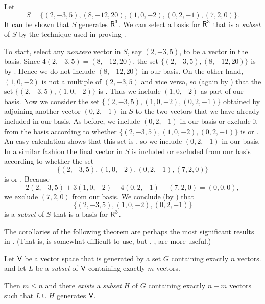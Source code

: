 \begin{example} \label{example 1.6.6}
Let
\[
    S = \{ (2, -3, 5), (8, -12, 20), (1, 0, -2), (0, 2, -1), (7, 2, 0) \}.
\]
It can be shown that \(S\) generates \(\textsf{R}^3\).
We can select a basis for \(\textsf{R}^3\) that is a \emph{subset} of \(S\) by the technique used in proving .

To start, select any \emph{nonzero} vector in \(S\), say \((2, -3, 5)\), to be a vector in the basis.
Since \(4(2, -3, 5) = (8 , -12, 20)\), the set \(\{ (2, -3, 5), (8 , -12, 20) \}\) is \LDP{} by .
Hence we do not include \((8, -12, 20)\) in our basis.
On the other hand, \((1, 0, -2)\) is not a multiple of \((2, -3, 5)\) and vice versa, so (again by ) that the set \(\{ (2, -3, 5), (1, 0, -2) \}\) is \LID{}.
Thus we include \((1, 0, -2)\) as part of our basis.
Now we consider the set \(\{ (2, -3, 5), (1, 0, -2), (0, 2, -1) \}\) obtained by adjoining another vector \((0, 2, -1)\) in \(S\) to the two vectors that we have already included in our basis.
As before, we include \((0, 2, -1)\) in our basis or exclude it from the basis according to whether \(\{ (2, -3, 5), (1, 0, -2), (0, 2, -1) \}\) is \LID{} or \LDP{}.
An easy calculation shows that this set is \LID{}, so we include \((0, 2, -1)\) in our basis.
In a similar fashion the final vector in \(S\) is included or excluded from our basis according to whether the set
\[
    \{ (2, -3, 5), (1, 0, -2), (0, 2, -1), (7, 2, 0) \}
\]
is \LID{} or \LDP{}.
Because
\[
    2(2, -3, 5) + 3(1, 0, -2) + 4(0, 2, -1) - (7, 2, 0) = (0, 0, 0),
\]
we exclude \((7, 2, 0)\) from our basis.
We conclude (by ) that
\[
    \{(2, -3, 5), (1, 0, -2), (0, 2, -1)\}
\]
is a \emph{subset} of \(S\) that is a basis for \(\textsf{R}^3\).
\end{example}

The corollaries of the following theorem are perhaps the most significant results in .
(That is,  is somewhat difficult to use, but , ,  are more useful.)

\begin{theorem}  \label{thm 1.10}
Let \(\textsf{V}\) be a vector space that is generated by a set \(G\) containing exactly \(n\) vectors.
and let \(L\) be a \LID{} \emph{subset} of \(\textsf{V}\) containing exactly \(m\) vectors.

Then  \(m \le n\)  and there \emph{exists} a \emph{subset} \(H\) of \(G\) containing exactly \(n - m\) vectors such that \(L \cup H\) generates \(\textsf{V}\).
\end{theorem}

